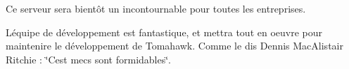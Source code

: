 Ce serveur sera bientôt un incontournable pour toutes les entreprises.

L\textquotesingle{}équipe de développement est fantastique, et mettra tout en oeuvre pour maintenire le développement de Tomahawk. Comme le dis Dennis Mac\+Alistair Ritchie \+: \char`\"{}\+C\textquotesingle{}est mecs sont formidables\char`\"{}.